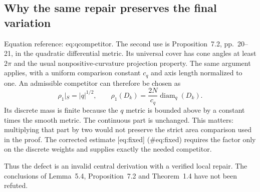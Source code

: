 \documentclass[10pt]{article}
\begin{document}
\subsection*{Why the same repair preserves the final variation}
Equation reference: eq:qcompetitor. The second use is Proposition 7.2, pp. 20–21, in the quadratic differential metric. Its universal cover has cone angles at least \(2\pi\) and the usual nonpositive-curvature projection property. The same argument applies, with a uniform comparison constant \(c_q\) and axis length normalized to one. An admissible competitor can therefore be chosen as \[\rho_1|_S=|q|^{1/2},\qquad
 \rho_1(D_k)=\frac{2N}{c_q}\operatorname{diam}_q(D_k).
 \] Its discrete mass is finite because the \(q\) metric is bounded above by a constant times the smooth metric. The continuous part is unchanged. This matters: multiplying that part by two would not preserve the strict area comparison used in the proof. The corrected estimate [eq:fixed] (\#eq:fixed) requires the factor only on the discrete weights and supplies exactly the needed competitor.\par
Thus the defect is an invalid central derivation with a verified local repair. The conclusions of Lemma 5.4, Proposition 7.2 and Theorem 1.4 have not been refuted.\par
\end{document}
